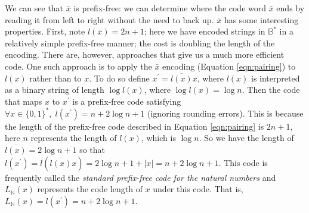 \documentclass[11pt, oneside]{article}   	%
\begin{document}
\bigskip
\noindent
We can see that $\bar{x}$ is prefix-free:  we can determine where the code word $\bar{x}$ ends by reading it from left to right without the need to back up. 
$\bar{x}$ has some interesting properties. First,
note $l(\bar{x}) = 2n + 1$; here we have encoded strings in $\mathbb{B}^*$ in a relatively simple prefix-free manner; the cost is doubling the length of the encoding. 
There are, however, approaches that give us a much more efficient code. One such approach is to apply the $\bar{x}$ encoding (Equation \ref{eqn:pairing})
to $l(x)$ rather than to $x$. To do so  define $x^\prime = \overline{l(x)}x$, where $l(x)$ is interpreted as a binary string of length 
$\log l(x)$, where $\log l(x) = \log n$. Then the code that maps $x$ to $x^\prime$ is a prefix-free code satisfying $\forall x \in \{0,1\}^*, \; l(x^\prime) = n + 2 \log n + 1$ (ignoring rounding errors). 
This is because the length of the prefix-free code described  in Equation \ref{eqn:pairing} is $2n + 1$, here $n$ represents the length of $l(x)$, which is $\log n$. So we have the length of 
$\overline{l(x)}  = 2 \log n + 1$  so that $l(x^\prime) = l(\overline{l(x)}x) = 2 \log n + 1 + |x| =  n + 2 \log n + 1$.
This code is frequently called the \emph{standard prefix-free code for the natural numbers} and $L_{\mathbb{N}}(x)$ represents the code length of $x$ under this code. That is,
$L_{\mathbb{N}}(x) = l(x^\prime) = n + 2 \log n + 1$. 


\newpage


\end{document}

